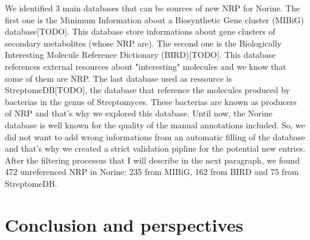 \documentclass[long, final]{jobim2017}
\begin{document}
We identified 3 main databases that can be sources of new NRP for Norine.
The first one is the Minimum Information about a Biosynthetic Gene cluster (MIBiG) database[TODO].
This database store informations about gene clusters of secondary metabolites (whose NRP are).
The second one is the Biologically Interesting Molecule Reference Dictionary (BIRD)[TODO].
This database references external resources about "interesting" molecules and we know that some of them are NRP.
The last database used as ressource is StreptomeDB[TODO], the database that reference the molecules produced by bacterias in the genus of Streptomyces.
These bacterias are known as producers of NRP and that's why we explored this database.
Until now, the Norine database is well known for the quality of the manual annotations included.
So, we did not want to add wrong informations from an automatic filling of the database and that's why we created a strict validation pipline for the potential new entries.
After the filtering processus that I will describe in the next paragraph, we found 472 unreferenced NRP in Norine: 235 from MIBiG, 162 from BIRD and 75 from StreptomeDB.


\section{Conclusion and perspectives}



 
 
\end{document}
